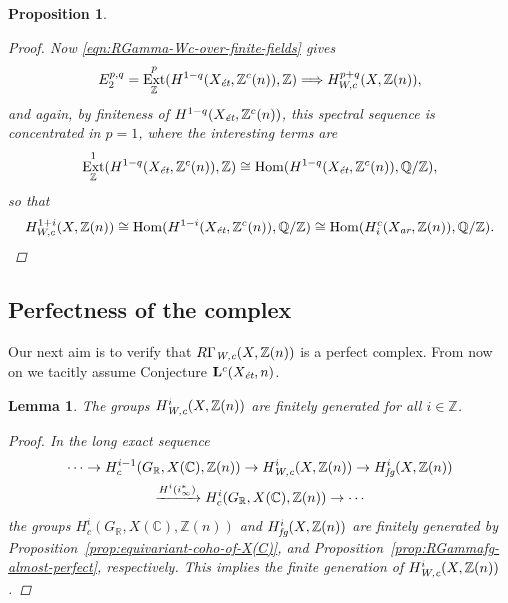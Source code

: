 \documentclass[leqno,12pt]{article}
\theoremstyle{plain}
\newtheorem{lemma}[theorem]{\indent\sc Lemma}
\newtheorem{proposition}[theorem]{\indent\sc Proposition}
\theoremstyle{definition}
\DeclareMathOperator{\Hom}{Hom}
\DeclareMathOperator{\Ext}{Ext}
\newcommand{\CC}{\mathbb{C}}
\newcommand{\QQ}{\mathbb{Q}}
\newcommand{\RR}{\mathbb{R}}
\newcommand{\ZZ}{\mathbb{Z}}
\newcommand{\Wc}{\text{\it W,c}}
\newcommand{\ar}{\text{\it ar}}
\newcommand{\et}{\text{\it \'{e}t}}
\newcommand{\fg}{\text{\it fg}}
\begin{document}
\begin{proposition}
\begin{proof}
    Now \eqref{eqn:RGamma-Wc-over-finite-fields} gives
    \begin{equation}
      \label{eqn:RGamma-Wc-over-finite-fields-ss}
      E_2^{p,q} = \Ext_\ZZ^p (H^{1-q} (X_\et, \ZZ^c (n)), \ZZ) \Longrightarrow
      H^{p+q}_{W,c} (X, \ZZ (n)),
    \end{equation}
    and again, by finiteness of $H^{1-q} (X_\et, \ZZ^c (n))$, this spectral
    sequence is concentrated in $p = 1$, where the interesting terms are
    \[ \Ext_\ZZ^1 (H^{1-q} (X_\et, \ZZ^c (n)), \ZZ) \cong
      \Hom (H^{1-q} (X_\et, \ZZ^c (n)), \QQ/\ZZ), \]
    so that
    \[ H^{1+i}_{W,c} (X, \ZZ (n)) \cong
      \Hom (H^{1-i} (X_\et, \ZZ^c (n)), \QQ/\ZZ) \cong
      \Hom (H_i^c (X_\ar, \ZZ (n)), \QQ/\ZZ). \qedhere \]
  \end{proof}
\end{proposition}

\subsection*{Perfectness of the complex}

Our next aim is to verify that $R\Gamma_\Wc (X, \ZZ(n))$ is a perfect
complex. From now on we tacitly assume Conjecture $\mathbf{L}^c (X_\et,n)$.

\begin{lemma}
  The groups $H^i_\Wc (X, \ZZ(n))$ are finitely generated for all $i \in \ZZ$.

  \begin{proof}
    In the long exact sequence
    \begin{multline*}
      \cdots \to H^{i-1}_c (G_\RR, X (\CC), \ZZ (n)) \to
      H^i_\Wc (X,\ZZ(n)) \to
      H^i_\fg (X,\ZZ(n)) \\
      \xrightarrow{H^i (i_\infty^*)}
      H^i_c (G_\RR, X (\CC), \ZZ (n)) \to \cdots
    \end{multline*}
    the groups $H^i_c (G_\RR, X (\CC), \ZZ (n))$ and $H^i_\fg (X, \ZZ(n))$ are
    finitely generated by
    Proposition~\ref{prop:equivariant-coho-of-X(C)}, and
    Proposition~\ref{prop:RGammafg-almost-perfect}, respectively.
    This implies the finite generation of $H^i_\Wc (X, \ZZ(n))$.
  \end{proof}
\end{lemma}
\end{document}
